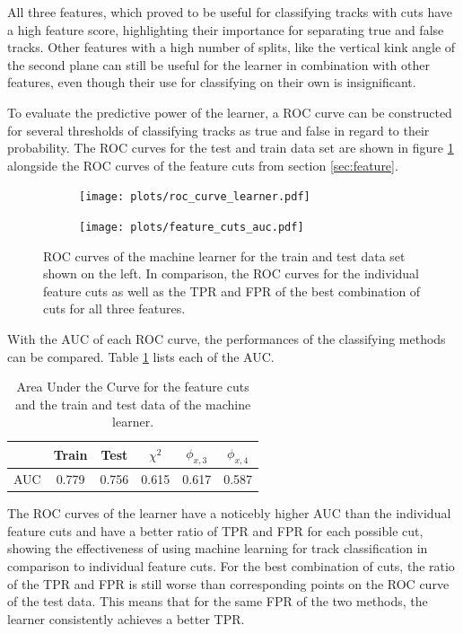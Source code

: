 All three features, which proved to be useful for classifying tracks with cuts have a high feature score, highlighting their importance for separating true and false tracks.
Other features with a high number of splits, like the vertical kink angle of the second plane can still be useful for the learner in combination with other features, even though
their use for classifying on their own is insignificant.

To evaluate the predictive power of the learner, a ROC curve can be constructed for several thresholds of classifying tracks as true and false in regard to
their probability. The ROC curves for the test and train data set are shown in figure \ref{fig:auc_comparison} alongside the ROC curves of the feature cuts from section \ref{sec:feature}.


\begin{figure}
  \hspace{-2.5cm}
  \begin{subfigure}{0.62\textwidth}
      \centering
      \texttt{[image: plots/roc\_curve\_learner.pdf]}
  \end{subfigure}
  \begin{subfigure}{0.62\textwidth}
      \hspace{0.95cm}
      \texttt{[image: plots/feature\_cuts\_auc.pdf]}
  \end{subfigure}
  \caption{ROC curves of the machine learner for the train and test data set shown on the left. In comparison, the ROC curves for the individual feature cuts as well as the
  TPR and FPR of the best combination of cuts for all three features.}
  \label{fig:auc_comparison}
\end{figure}

With the AUC of each ROC curve, the performances of the classifying methods can be compared. Table \ref{tab:AUC} lists each of the AUC.

\begin{table}
  \centering
  \begin{tabular}{c | c c c c c}
    \toprule
      & Train & Test & $\chi^2$ & $\phi_{x,3}$ & $\phi_{x,4}$\\
    \midrule
    AUC & 0.779 & 0.756 & 0.615 & 0.617 & 0.587 \\
  \end{tabular}
  \caption{Area Under the Curve for the feature cuts and the train and test data of the machine learner.}
  \label{tab:AUC}
\end{table}

The ROC curves of the learner have a noticebly higher AUC than the individual feature cuts and have a better ratio of TPR and FPR for each possible cut, showing the effectiveness
of using machine learning for track classification in comparison to individual feature cuts. For the best combination of cuts, the ratio of the TPR and FPR is still worse than
corresponding points on the ROC curve of the test data. This means that for the same FPR of the two methods, the learner consistently achieves a better TPR.  
